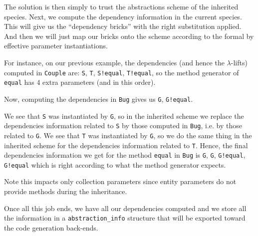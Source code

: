 \medskip
The solution is then simply to trust the abstractions scheme of the
inherited species. Next, we compute the dependency information in the
current species. This will give us the ``dependency bricks'' with the
right substitution applied. And then we will just map our bricks onto
the scheme according to the formal by effective parameter
instantiations.

For instance, on our previous example, the dependencies (and hence the
$\lambda$-lifts) computed in {\tt Couple} are: {\tt S}, {\tt T},
{\tt S!equal}, {\tt T!equal}, so the method generator of {\tt equal}
has 4 extra parameters (and in this order).

Now, computing the dependencies in {\tt Bug} gives us {\tt G},
{\tt G!equal}.

We see that {\tt S} was instantiated by {\tt G}, so in the inherited
scheme we replace the dependencies information related to {\tt S} by
those computed in {\tt Bug}, i.e. by those related to {\tt G}. We see
that {\tt T} was instantiated by {\tt G}, so we do the same thing in
the inherited scheme for the dependencies information related to
{\tt T}. Hence, the final dependencies information we get for the
method {\tt equal} in {\tt Bug} is {\tt G}, {\tt G}, {\tt G!equal},
{\tt G!equal} which is right according to what the method generator
expects.

\medskip
Note this impacts only collection parameters since entity parameters
do not provide methods during the inheritance.

\medskip
Once all this job ends, we have all our dependencies computed and we
store all the information in a {\tt abstraction\_info} structure that
will be exported toward the code generation back-ends.
